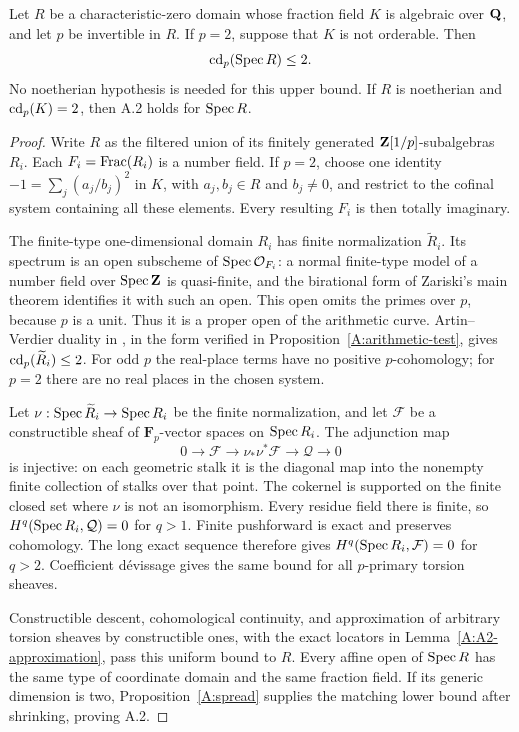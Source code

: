 \begin{proposition}
\label{A:A2-arithmetic-two}
Let $R$ be a characteristic-zero domain whose fraction field $K$ is
algebraic over $\mathbf Q$, and let $p$ be invertible in $R$. If $p=2$,
suppose that $K$ is not orderable. Then
\[
 \operatorname{cd}_p(\operatorname{Spec} R)\leq2.
\]
No noetherian hypothesis is needed for this upper bound. If $R$ is
noetherian and $\operatorname{cd}_p(K)=2$, then A.2 holds for $\operatorname{Spec} R$.
\end{proposition}
\begin{proof}
Write $R$ as the filtered union of its finitely generated
$\mathbf Z[1/p]$-subalgebras $R_i$. Each $F_i=\operatorname{Frac}(R_i)$ is a number
field. If $p=2$, choose one identity
$-1=\sum_j (a_j/b_j)^2$ in $K$, with $a_j,b_j\in R$ and
$b_j\ne0$, and restrict to the cofinal system containing all these
elements. Every resulting $F_i$ is then totally imaginary.

The finite-type one-dimensional domain $R_i$ has finite
normalization $\widetilde R_i$. Its spectrum is an open subscheme
of $\operatorname{Spec}\mathcal O_{F_i}$: a normal finite-type model of a number
field over $\operatorname{Spec}\mathbf Z$ is quasi-finite, and the birational form of
Zariski's main theorem identifies it with such an open. This open
omits the primes over $p$, because $p$ is a unit. Thus it is a
proper open of the arithmetic curve. Artin--Verdier duality in
\citet[Chapter II, Theorem 3.1, Corollary 3.2, and Proposition 2.3(a)]{A_Milne2006},
in the form verified in Proposition~\ref{A:arithmetic-test}, gives
$\operatorname{cd}_p(\widetilde R_i)\leq2$. For odd $p$ the real-place terms have
no positive $p$-cohomology; for $p=2$ there are no real places in
the chosen system.

Let $\nu:\operatorname{Spec}\widetilde R_i\to\operatorname{Spec} R_i$ be the finite
normalization, and let $\mathcal F$ be a constructible sheaf of
$\mathbf F_p$-vector spaces on $\operatorname{Spec} R_i$. The adjunction map
\[
 0\longrightarrow\mathcal F\longrightarrow
 \nu_*\nu^*\mathcal F\longrightarrow\mathcal Q\longrightarrow0
\]
is injective: on each geometric stalk it is the diagonal map into
the nonempty finite collection of stalks over that point. The
cokernel is supported on the finite closed set where $\nu$ is not
an isomorphism. Every residue field there is finite, so
$H^q(\operatorname{Spec} R_i,\mathcal Q)=0$ for $q>1$. Finite pushforward is
exact and preserves cohomology. The long exact sequence therefore
gives $H^q(\operatorname{Spec} R_i,\mathcal F)=0$ for $q>2$.
Coefficient d\'evissage gives the same bound for all $p$-primary
torsion sheaves.

Constructible descent, cohomological continuity, and approximation
of arbitrary torsion sheaves by constructible ones, with the exact
locators in Lemma~\ref{A:A2-approximation}, pass this uniform bound
to $R$. Every affine open of $\operatorname{Spec} R$ has the same type of
coordinate domain and the same fraction field. If its generic
dimension is two, Proposition~\ref{A:spread} supplies the matching
lower bound after shrinking, proving A.2.
\end{proof}

